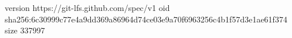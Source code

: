 version https://git-lfs.github.com/spec/v1
oid sha256:6c30999c77e4a9dd369a86964d74ce03e9a70f6963256c4b1f57d3e1ae61f374
size 337997
